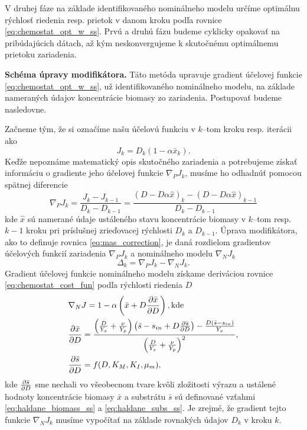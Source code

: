 V druhej fáze na základe identifikovaného nominálneho modelu určíme optimálnu rýchlosť riedenia resp. prietok v danom kroku podľa rovnice \eqref{eq:chemostat_opt_w_ss}. Prvú a druhú fázu budeme cyklicky opakovať na pribúdajúcich dátach, až kým neskonvergujeme k skutočnému optimálnemu prietoku zariadenia.

\textbf{Schéma úpravy modifikátora.}
Táto metóda upravuje gradient účelovej funkcie \eqref{eq:chemostat_opt_w_ss}, už identifikovaného nominálneho modelu, na základe nameraných údajov koncentrácie biomasy zo zariadenia. Postupovať budeme nasledovne.

Začneme tým, že si označíme našu účelovú funkciu v $ k $--tom kroku resp. iterácii ako
\begin{equation}
\label{eq:chemostat_cost_fun}
	J_{k} = D_{k}\left(1-\alpha\bar{x}_{k}\right).
\end{equation}
Keďže nepoznáme matematický opis skutočného zariadenia a potrebujeme získať informáciu o gradiente jeho účelovej funkcie $ \nabla_{P}J_{k} $, musíme ho odhadnúť pomocou spätnej diferencie
\begin{equation}
	\nabla_{P}J_{k} = \frac{J_{k} - J_{k-1}}{D_{k} - D_{k-1}} = \frac{\left(D-D\alpha\hat{x}\right)_{k} - \left(D-D\alpha\hat{x}\right)_{k-1}}{D_{k} - D_{k-1}}
\end{equation}
kde $ \hat{x} $ sú namerané údaje ustáleného stavu koncentrácie biomasy v $ k $--tom resp. $ k-1 $ kroku pri príslušnej zrieďovacej rýchlosti $ D_{k} $ a $ D_{k-1} $. Úprava modifikátora, ako to definuje rovnica \eqref{eq:mas_correction}, je daná rozdielom gradientov účelových funkcií zariadenia $ \nabla_{P}J_{k} $ a nominálneho modelu $ \nabla_{N}J_{k} $ 
\begin{equation}
\label{eq:mas_chemostat_modifierValue}
	\Delta_k = \nabla_{P}J_{k} - \nabla_{N}J_{k}.
\end{equation}
Gradient účelovej funkcie nominálneho modelu získame deriváciou rovnice \eqref{eq:chemostat_cost_fun} podľa rýchlosti riedenia $ D $
\begin{align}
	&\nabla_{N}J = 1 - \alpha\left(\bar{x}+D\frac{\partial \bar{x}}{\partial D}\right), \text{kde}\\
	&\frac{\partial \bar{x}}{\partial D} = \frac{\left(\frac{D}{Y_{x}} + \frac{\nu}{Y_{p}}\right)\left(\bar{s}-s_{in}+D\frac{\partial \bar{s}}{\partial D}\right) - \frac{D\left(\bar{s}-s_{in}\right)}{Y_{x}}}{\left(\frac{D}{Y_{x}} + \frac{\nu}{Y_{p}}\right)^2},	\\
	&\frac{\partial \bar{s}}{\partial D} = f(D,K_{M},K_{I},\mu_{m}),
\end{align}
kde $ \frac{\partial \bar{s}}{\partial D} $ sme nechali vo všeobecnom tvare kvôli zložitosti výrazu a ustálené hodnoty koncentrácie biomasy $ \bar{x} $ a substrátu $ \bar{s} $ sú definované vzťahmi \eqref{eq:haldane_biomass_ss} a \eqref{eq:haldane_subs_ss}. Je zrejmé, že gradient tejto funkcie $ \nabla_{N}J_{k} $ musíme vypočítať na základe rovnakých údajov $ D_k $ v kroku $ k $. 

